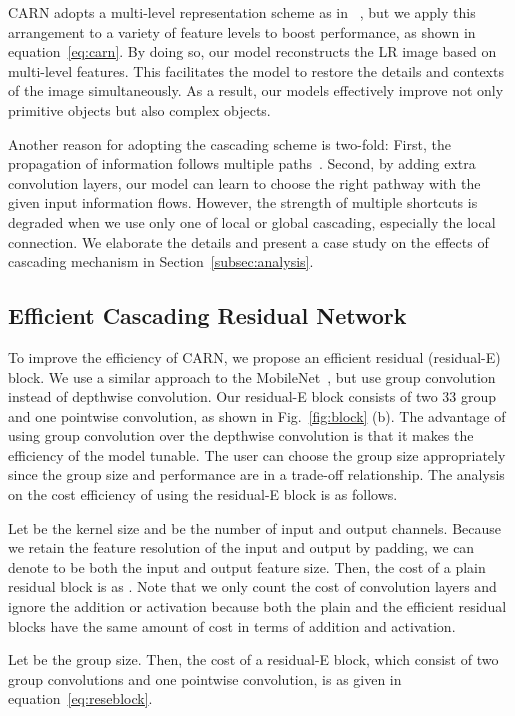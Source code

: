 \documentclass[runningheads]{llncs}
\begin{document}
CARN adopts a multi-level representation scheme as in ~\cite{lee2017multi,long2015fully}, but we apply this arrangement to a variety of feature levels to boost performance, as shown in equation~\ref{eq:carn}. By doing so, our model reconstructs the LR image based on multi-level features. This facilitates the model to restore the details and contexts of the image simultaneously. As a result, our models effectively improve not only primitive objects but also complex objects.

Another reason for adopting the cascading scheme is two-fold:
First, the propagation of information follows multiple paths~\cite{densenet,unet}.
Second, by adding extra convolution layers, our model can learn to choose the right pathway with the given input information flows. However, the strength of multiple shortcuts is degraded when we use only one of local or global cascading, especially the local connection. We elaborate the details and present a case study on the effects of cascading mechanism in Section~\ref{subsec:analysis}.

\subsection{Efficient Cascading Residual Network}
\label{subsec:carn-m}
To improve the efficiency of CARN, we propose an efficient residual (residual-E) block. We use a similar approach to the MobileNet~\cite{mobilenets}, but use group convolution instead of depthwise convolution. Our residual-E block consists of two 33 group and one pointwise convolution, as shown in Fig.~\ref{fig:block} (b). The advantage of using group convolution over the depthwise convolution is that it makes the efficiency of the model tunable. The user can choose the group size appropriately since the group size and performance are in a trade-off relationship. The analysis on the cost efficiency of using the residual-E block is as follows.

Let  be the kernel size and  be the number of input and output channels. Because we retain the feature resolution of the input and output by padding, we can denote  to be both the input and output feature size. Then, the cost of a plain residual block is as . Note that we only count the cost of convolution layers and ignore the addition or activation because both the plain and the efficient residual blocks have the same amount of cost in terms of addition and activation.

Let  be the group size. Then, the cost of a residual-E block, which consist of two group convolutions and one pointwise convolution, is as given in equation~\ref{eq:reseblock}.
\end{document}
